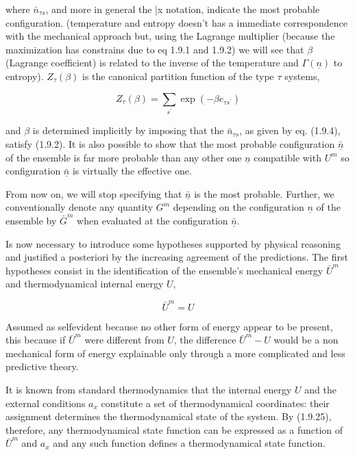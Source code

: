 \documentclass{article}
\begin{document}
where $\bar{n}_{\tau s}$, and more in general the \bar{x} notation, indicate the most probable configuration. (temperature and entropy doesn't has a immediate correspondence with the mechanical approach but, using the Lagrange multiplier (because the maximization has constrains due to eq 1.9.1 and 1.9.2) we will see that $\beta$ (Lagrange coefficient) is related to the inverse of the temperature and $\Gamma(\underline{n})$ to entropy). $Z_{\tau}(\beta)$ is the canonical partition function of the type $\tau$ systems,

\begin{equation}
Z_{\tau}(\beta)=\sum_{s^{\prime}} \exp \left(-\beta e_{\tau s^{\prime}}\right) \tag{1.9.5}
\end{equation}

and $\beta$ is determined implicitly by imposing that the $\bar{n}_{\tau s}$, as given by eq. (1.9.4), satisfy (1.9.2). It is also possible to show that the most probable configuration $\underline{\bar{n}}$ of the ensemble is far more probable than any other one $\underline{n}$ compatible with $U^{m}$ so configuration $\underline{\bar{n}}$ is virtually the effective one.

From now on, we will stop specifying that $\underline{\bar{n}}$ is the most probable. Further, we conventionally denote any quantity $G^{m}$ depending on the configuration $\underline{n}$ of the ensemble by $\bar{G}^{m}$ when evaluated at the configuration $\underline{\bar{n}}$.

Is now necessary to introduce some hypotheses supported by physical reasoning and justified a posteriori by the increasing agreement of the predictions. The first hypotheses consist in the identification of the ensemble's mechanical energy $\bar{U}^{m}$ and thermodynamical internal energy $U$,

\begin{equation*}
\bar{U}^{m}=U \tag{1.9.25}
\end{equation*}

Assumed as selfevident because no other form of energy appear to be present, this because if $\bar{U}^{m}$ were different from $U$, the difference $\bar{U}^{m}-U$ would be a non mechanical form of energy explainable only through a more complicated and less predictive theory.

It is known from standard thermodynamics that the internal energy $U$ and
the external conditions $a_{x}$ constitute a set of thermodynamical coordinates: their assignment determines the thermodynamical state of the system. By (1.9.25), therefore, any thermodynamical state function can be expressed as a function of $\bar{U}^{m}$ and $a_{x}$ and any such function defines a thermodynamical state function.
\end{document}
